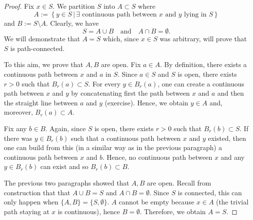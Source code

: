 \begin{proof}
	Fix $x\in S$. We partition $S$ into $A\subset S$ where
	\[
	A:= \left\{
	y \in S \, | \, \exists\text{ continuous path between $x$ and $y$ lying in $S$}
	\right\}
	\]
	and $B:= S\setminus A$. Clearly, we have
	\[
	S = A\cup B\quad\text{and}\quad A\cap B = \emptyset.
	\]
	We will demonstrate that $A = S$ which, since $x\in S$ was arbitrary, will prove that $S$ is path-connected. 
	
	To this aim, we prove that $A,B$ are open. Fix $a\in A$. By definition, there exists a continuous path between $x$ and $a$ in $S$. Since $a\in S$ and $S$ is open, there exists $r>0$ such that $B_r(a) \subset S$. For every $y \in B_r(a)$, one can create a continuous path between $x$ and $y$ by concatenating first the path between $x$ and $a$ and then the straight line between $a$ and $y$ (exercise). Hence, we obtain $y\in A$ and, moreover, $B_r(a) \subset A$.
	
	Fix any $b\in B$. Again, since $S$ is open, there exists $r>0$ such that $B_r(b) \subset S$. If there was $y\in B_r(b)$ such that a continuous path between $x$ and $y$ existed, then one can build from this (in a similar way as in the previous paragraph) a continuous path between $x$ and $b$. Hence, no continuous path between $x$ and any $y\in B_r(b)$ can exist and so $B_r(b)\subset B$.
	
	The previous two paragraphs showed that $A,B$ are open. Recall from construction that that $A\cup B = S$ and $A\cap B = \emptyset$. Since $S$ is connected, this can only happen when $\{A,B\} = \{S,\emptyset\}$. $A$ cannot be empty because $x\in A$ (the trivial path staying at $x$ is continuous), hence $B = \emptyset$. Therefore, we obtain $A = S$.
\end{proof}